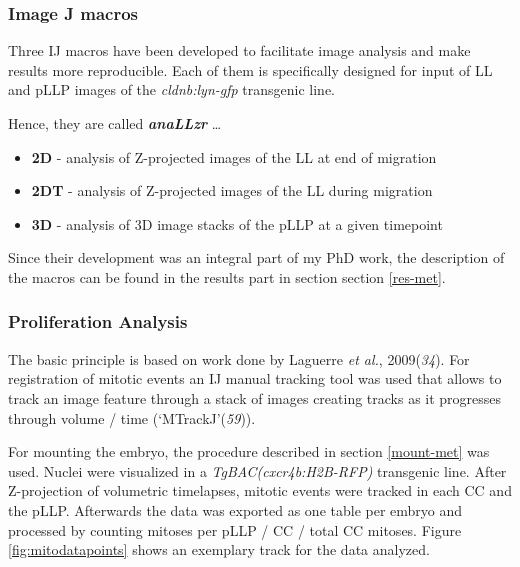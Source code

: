 \documentclass[11pt,singlespacinge,twoside]{reedthesis} %
\providecommand{\tightlist}{%
  \setlength{\itemsep}{0pt}\setlength{\parskip}{0pt}}
\theoremstyle{definition}
\theoremstyle{definition}
\theoremstyle{definition}
\theoremstyle{remark}
\begin{document}
\hypertarget{image-j-macros}{%
\subsubsection{Image J macros}\label{image-j-macros}}

Three IJ macros have been developed to facilitate image analysis and make results more reproducible. Each of them is specifically designed for input of LL and pLLP images of the \emph{cldnb:lyn-gfp} transgenic line.

Hence, they are called \textbf{\emph{anaLLzr}} \ldots{}
\begin{itemize}
\tightlist
\item
  \textbf{2D} - analysis of Z-projected images of the LL at end of migration
\item
  \textbf{2DT} - analysis of Z-projected images of the LL during migration
\item
  \textbf{3D} - analysis of 3D image stacks of the pLLP at a given timepoint
\end{itemize}
Since their development was an integral part of my PhD work, the description of the macros can be found in the results part in section section \ref{res-met}.

\hypertarget{prolif}{%
\subsubsection{Proliferation Analysis}\label{prolif}}

The basic principle is based on work done by Laguerre \emph{et al.}, 2009(\emph{34}). For registration of mitotic events an IJ manual tracking tool was used that allows to track an image feature through a stack of images creating tracks as it progresses through volume / time (`MTrackJ'(\emph{59})).

For mounting the embryo, the procedure described in section \ref{mount-met} was used. Nuclei were visualized in a \emph{TgBAC(cxcr4b:H2B-RFP)} transgenic line. After Z-projection of volumetric timelapses, mitotic events were tracked in each CC and the pLLP. Afterwards the data was exported as one table per embryo and processed by counting mitoses per pLLP / CC / total CC mitoses. Figure \ref{fig:mitodatapoints} shows an exemplary track for the data analyzed.
\end{document}
